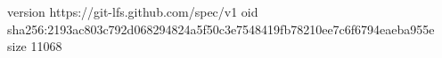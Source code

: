 version https://git-lfs.github.com/spec/v1
oid sha256:2193ac803c792d068294824a5f50c3e7548419fb78210ee7c6f6794eaeba955e
size 11068
